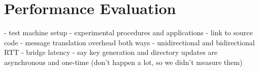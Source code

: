 \section{Performance Evaluation}

- test machine setup
- experimental procedures and applications
- link to source code
- message translation overhead both ways
- unidirectional and bidirectional RTT
- bridge latency
- say key generation and directory updates are asynchronous and one-time (don't happen a lot, so we didn't measure them)

